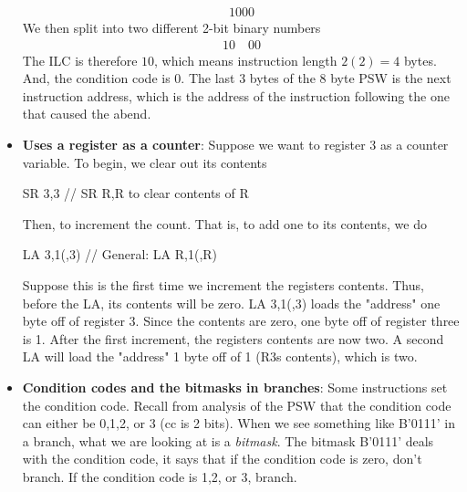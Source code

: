 \documentclass{report}
\begin{document}
\begin{itemize}
                    \begin{align*}
                        1000
                    \end{align*}
                    We then split into two different 2-bit binary numbers
                    \begin{align*}
                        10 \quad 00
                    \end{align*}
                    The ILC is therefore $10$, which means instruction length $2(2) = 4$ bytes. And, the condition code is 0.
                    \bigbreak \noindent 
                    The last 3 bytes of the 8 byte PSW is the next instruction address, which is the address of the instruction following the one that caused the abend. 
                \item \textbf{Uses a register as a counter}: Suppose we want to register 3 as a counter variable. To begin, we clear out its contents 
                    \bigbreak \noindent 
                    \begin{cppcode}
                    SR 3,3 // SR R,R to clear contents of R
                    \end{cppcode}
                    \bigbreak \noindent 
                    Then, to increment the count. That is, to add one to its contents, we do
                    \bigbreak \noindent 
                    \begin{cppcode}
                    LA 3,1(,3)  // General: LA R,1(,R)
                    \end{cppcode}
                    \bigbreak \noindent 
                    Suppose this is the first time we increment the registers contents. Thus, before the LA, its contents will be zero. LA 3,1(,3) loads the "address" one byte off of register 3. Since the contents are zero, one byte off of register three is 1.
                    \bigbreak \noindent 
                    After the first increment, the registers contents are now two. A second LA will load the "address" 1 byte off of 1 (R3s contents), which is two.
                \item \textbf{Condition codes and the bitmasks in branches}: Some instructions set the condition code. Recall from analysis of the PSW that the condition code can either be 0,1,2, or 3 (cc is 2 bits). When we see something like B'0111' in a branch, what we are looking at is a \textit{bitmask}. The bitmask B'0111' deals with the condition code, it says that if the condition code is zero, don't branch. If the condition code is 1,2, or 3, branch.

\end{itemize}
\end{document}
